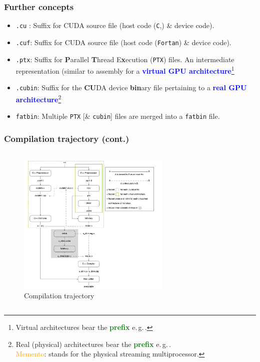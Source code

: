 \begin{frame}
   \frametitle{Further concepts}
      \begin{itemize}
	 \item \texttt{.cu} : Suffix for CUDA source file (host code (\texttt{C},\CC) \& device code).
	 \item \texttt{.cuf}: Suffix for CUDA source file (host code (\texttt{Fortan}) \& device code).
	 \item \texttt{.ptx}: Suffix for \textbf{P}arallel \textbf{T}hread E\textbf{x}ecution (\texttt{PTX}) files. 
		 An intermediate representation (similar to assembly for a 
		      \textbf{\textcolor{blue}{virtual GPU architecture}}\footnote{Virtual architectures 
		      bear the  \textbf{\textcolor{green}{prefix}} e.\,g.\,.}
	 \item \texttt{.cubin}: Suffix for the \textbf{CU}DA device \textbf{bin}ary 
		 file pertaining to a \textbf{\textcolor{blue}{real GPU architecture}}\footnote{Real (physical) architectures
		      bear the  \textbf{\textcolor{green}{prefix}} e.\,g.\,.\\
		      \hspace{4ex}\textcolor{orange}{Memento}:  stands 
		      for the physical streaming multiprocessor.}
	 \item \texttt{fatbin}: Multiple \texttt{PTX} [\& \texttt{cubin}] files are merged into a \texttt{fatbin} file.
      \end{itemize}
\end{frame}	

\begin{frame}
   \frametitle{Compilation trajectory (cont.)}
      \begin{columns}
           \begin{figure}[H]
              \centering
              \includegraphics[width=0.65\textwidth]{./img/compileTrajectory.png}
	      \caption{\small{Compilation trajectory}}
           \end{figure}
        \end{columns}
\end{frame}     


